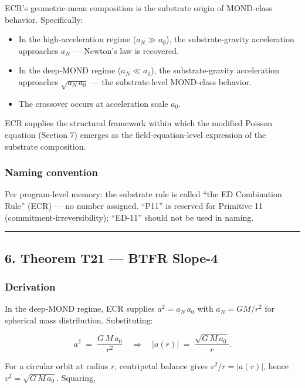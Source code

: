\documentclass[
]{article}
\providecommand{\tightlist}{%
  \setlength{\itemsep}{0pt}\setlength{\parskip}{0pt}}
\begin{document}
ECR's geometric-mean composition is the substrate origin of MOND-class
behavior. Specifically:

\begin{itemize}
\tightlist
\item
  In the high-acceleration regime (\(a_N \gg a_0\)), the
  substrate-gravity acceleration approaches \(a_N\) --- Newton's law is
  recovered.
\item
  In the deep-MOND regime (\(a_N \ll a_0\)), the substrate-gravity
  acceleration approaches \(\sqrt{a_N\,a_0}\) --- the substrate-level
  MOND-class behavior.
\item
  The crossover occurs at acceleration scale \(a_0\).
\end{itemize}

ECR supplies the structural framework within which the modified Poisson
equation (Section 7) emerges as the field-equation-level expression of
the substrate composition.

\subsubsection{Naming convention}\label{naming-convention}

Per program-level memory: the substrate rule is called ``the ED
Combination Rule'' (ECR) --- no number assigned. ``P11'' is reserved for
Primitive 11 (commitment-irreversibility); ``ED-11'' should not be used
in naming.

\begin{center}\rule{0.5\linewidth}{0.5pt}\end{center}

\subsection{6. Theorem T21 --- BTFR
Slope-4}\label{theorem-t21-btfr-slope-4}

\subsubsection{Derivation}\label{derivation}

In the deep-MOND regime, ECR supplies \(a^2 = a_N\,a_0\) with
\(a_N = GM/r^2\) for spherical mass distribution. Substituting:

\[a^2 \;=\; \frac{G\,M\,a_0}{r^2} \quad\Longrightarrow\quad |a(r)| \;=\; \frac{\sqrt{G\,M\,a_0}}{r}.\]

For a circular orbit at radius \(r\), centripetal balance gives
\(v^2/r = |a(r)|\), hence \(v^2 = \sqrt{G\,M\,a_0}\). Squaring,
\end{document}
